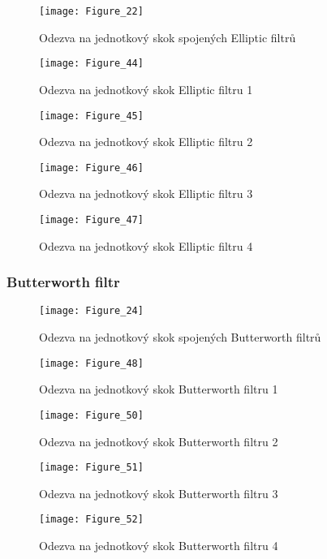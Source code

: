 \begin{figure}[H] 
	\centering
	\texttt{[image: Figure\_22]}
	\caption{Odezva na jednotkový skok spojených Elliptic filtrů}
\end{figure}

\begin{figure}[H] 
	\centering
	\texttt{[image: Figure\_44]}
	\caption{Odezva na jednotkový skok Elliptic filtru 1}
\end{figure}

\begin{figure}[H] 
	\centering
	\texttt{[image: Figure\_45]}
	\caption{Odezva na jednotkový skok Elliptic filtru 2}
\end{figure}

\begin{figure}[H] 
	\centering
	\texttt{[image: Figure\_46]}
	\caption{Odezva na jednotkový skok Elliptic filtru 3}
\end{figure}

\begin{figure}[H] 
	\centering
	\texttt{[image: Figure\_47]}
	\caption{Odezva na jednotkový skok Elliptic filtru 4}
\end{figure}


\subsubsection{Butterworth filtr}

\begin{figure}[H] 
	\centering
	\texttt{[image: Figure\_24]}
	\caption{Odezva na jednotkový skok spojených Butterworth filtrů}
\end{figure}

\begin{figure}[H] 
	\centering
	\texttt{[image: Figure\_48]}
	\caption{Odezva na jednotkový skok Butterworth filtru 1}
\end{figure}

\begin{figure}[H] 
	\centering
	\texttt{[image: Figure\_50]}
	\caption{Odezva na jednotkový skok Butterworth filtru 2}
\end{figure}

\begin{figure}[H] 
	\centering
	\texttt{[image: Figure\_51]}
	\caption{Odezva na jednotkový skok Butterworth filtru 3}
\end{figure}

\begin{figure}[H] 
	\centering
	\texttt{[image: Figure\_52]}
	\caption{Odezva na jednotkový skok Butterworth filtru 4}
\end{figure}
